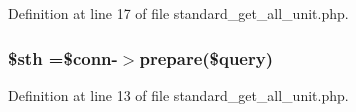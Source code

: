 Definition at line 17 of file standard\-\_\-get\-\_\-all\-\_\-unit.\-php.

\hypertarget{standard__get__all__unit_8php_afa9126f9664959c02795be300a135f93}{
\subsubsection[{\$sth}]{\setlength{\rightskip}{0pt plus 5cm}\$sth =\$conn-\/$>$prepare(\$query)}}\label{standard__get__all__unit_8php_afa9126f9664959c02795be300a135f93}


Definition at line 13 of file standard\-\_\-get\-\_\-all\-\_\-unit.\-php.

